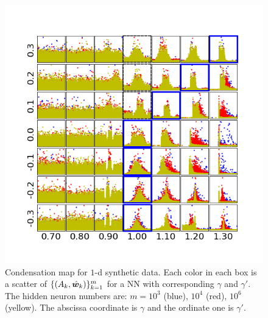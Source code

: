 \documentclass{article}
\begin{document}
\begin{figure}
    \centering
    \includegraphics[scale=0.8]{pic/systemexplarg3/scalestudy3/angleamptogether.png}
    \caption{Condensation map for $1$-d synthetic data. Each color in each box is a scatter of $\{(A_k,\hat{\bm{w}}_k)\}_{k=1}^m$ for a NN with corresponding $\gamma$ and $\gamma'$. The hidden neuron numbers are:  $m=10^{3}$ (blue), $10^{4}$ (red), $10^{6}$ (yellow). The abscissa coordinate is $\gamma$ and the ordinate one is $\gamma'$.}
    \label{fig:cdnmap}
\end{figure}
\end{document}
